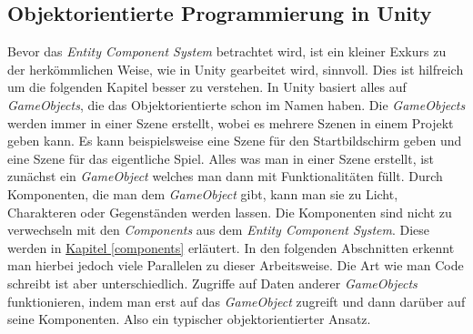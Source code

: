\subsection{Objektorientierte Programmierung in Unity}
Bevor das \textit{Entity Component System} betrachtet wird, ist ein kleiner Exkurs zu der herkömm\-lichen Weise, wie in Unity gearbeitet wird, sinnvoll. Dies ist hilfreich um die folgenden Kapitel besser zu verstehen. In Unity basiert alles auf \textit{GameObjects}, die das Objektorientierte schon im Namen haben. Die \textit{GameObjects} werden immer in einer Szene erstellt, wobei es mehrere Szenen in einem Projekt geben kann. Es kann beispielsweise eine Szene für den Startbildschirm geben und eine Szene für das eigentliche Spiel. Alles was man in einer Szene erstellt, ist zunächst ein \textit{GameObject} welches man dann mit Funktionalitäten füllt. Durch Komponenten, die man dem \textit{GameObject} gibt, kann man sie zu Licht, Charakteren oder Gegenständen werden lassen. Die Komponenten sind nicht zu verwechseln mit den \textit{Components} aus dem \textit{Entity Component System}. Diese werden in \hyperref[components]{Kapitel \ref{components}} erläutert. In den folgenden Abschnitten erkennt man hierbei jedoch viele Parallelen zu dieser Arbeitsweise. Die Art wie man Code schreibt ist aber unterschiedlich. Zugriffe auf Daten anderer \textit{GameObjects} funktionieren, indem man erst auf das \textit{GameObject} zugreift und dann darüber auf seine Komponenten. Also ein typischer objektorientierter Ansatz.


